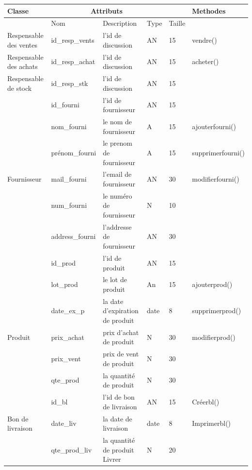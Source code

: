 \documentclass[edit,12pt,a4paper,ChapStyle,oneside,doubleinterligne]{report}
\begin{document}
\begin{table}[H]
    \centering
    \begin{tabular}{ | m{} | m{}| m{3cm} |m{}|m{}|l|}
    \hline
         Classe&\multicolumn{3}{c}{Attributs}&\phantom{h} &Methodes\\
         \hline &Nom&Description&Type&Taille&\\\cline{2-5}
         Respensable des ventes  &id\_resp\_vents&l'id de discussion&AN&15&vendre() \\\hline
        Respensable des achats  &id\_resp\_achat&l'id de discussion&AN&15&acheter() \\\hline
         
        Respensable de stock    &id\_resp\_stk&l'id de discussion&AN&15& \\\hline


                    &id\_fourni    &l'id de fournisseur&AN&15& \\\cline{2-6}
                    &nom\_fourni   &le nom de fournisseur&A&15&ajouterfourni() \\\cline{2-6}
                    &prénom\_fourni&le prenom de fournisseur&A&15&supprimerfourni() \\\cline{2-6}
        Fournisseur &mail\_fourni  &l'email de fournisseur&AN&30&modifierfourni() \\\cline{2-6}
                    &num\_fourni   &le numéro de fournisseur&N&10&\\\cline{2-5}
                    &address\_fourni&l'addresse de fournisseur&AN&30&\\\hline

                    &id\_prod    &l'id de produit&AN&15& \\\cline{2-6}
                    &lot\_prod   &le lot de produit&An&15&ajouterprod() \\\cline{2-6}
                    &date\_ex\_p &la date d'expiration de produit&date&8&supprimerprod() \\\cline{2-6}
        Produit     &prix\_achat &prix d'achat de produit&N&30&modifierprod() \\\cline{2-6}
                    &prix\_vent  &prix de vent de produit&N&30&\\\cline{2-5}
                    &qte\_prod   &la quantité de produit&N&30&\\\hline

                    
                    &id\_bl &l'id de bon de livraison&AN&15& Créerbl()\\\cline{2-6}
    Bon de livraison&date\_liv &la date de livraison&date&8&Imprimerbl()\\\cline{2-6}
                    &qte\_prod\_liv&la quantité de produit Livrer&N&20&\\\hline
                    


\end{tabular}
\end{table}
\end{document}
